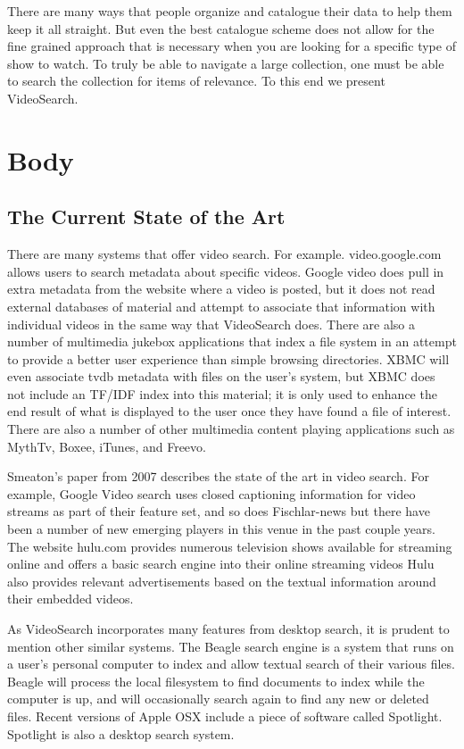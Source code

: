 \documentclass{acm_proc_article-sp}
\begin{document}
    There are many ways that people organize and catalogue their data to help them keep it all straight. But even the best catalogue scheme does not allow for the fine grained approach that is necessary when you are looking for a specific type of show to watch. To truly be able to navigate a large collection, one must be able to search the collection for items of relevance. To this end we present VideoSearch.  
\section{Body}
\subsection{The Current State of the Art}

    There are many systems that offer video search.  For example. video.google.com allows users to search metadata about specific videos.  Google video does pull in extra metadata from the website where a video is posted, but it does not read external databases of material and attempt to associate that information with individual videos in the same way that VideoSearch does.  There are also a number of multimedia jukebox applications that index a file system in an attempt to provide a better user experience than simple browsing directories. XBMC will even associate tvdb metadata with files on the user\textquoteright s system\cite{goodwin2010appliance}, but XBMC does not include an TF/IDF index into this material; it is only used to enhance the end result of what is displayed to the user once they have found a file of interest. There are also a number of other multimedia content playing applications such as MythTv, Boxee, iTunes, and Freevo.\cite{schopman2010notube}

    Smeaton\textquoteright s paper from 2007 describes the state of the art in video search. \cite{smeaton2007techniques} For example, Google Video search uses closed captioning information for video streams as part of their feature set, and so does Fischlar-news \cite{lee2006user} but there have been a number of new emerging players in this venue in the past couple years.  The website hulu.com provides numerous television shows available for streaming online and offers a basic search engine into their online streaming videos \cite{patent:20100287474} Hulu also provides relevant advertisements based on the textual information around their embedded videos.

    As VideoSearch incorporates many features from desktop search, it is prudent to mention other similar systems.  The Beagle search engine is a system that runs on a user\textquoteright s personal computer to index and allow textual search of their various files.  \cite{brunkhorst2006beagle++}  Beagle will process the local filesystem to find documents to index while the computer is up, and will occasionally search again to find any new or deleted files.  Recent versions of Apple OSX include a piece of software called Spotlight.\cite{applex} Spotlight is also a desktop search system.
\end{document}
